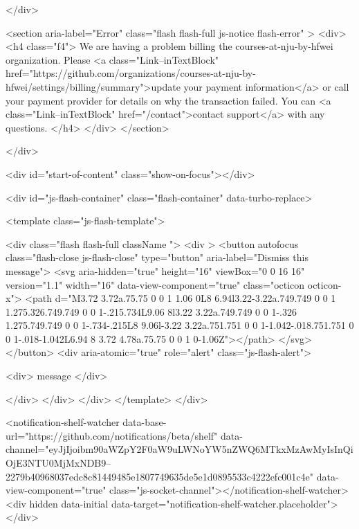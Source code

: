 {{  
</div>
        
          
                <section aria-label="Error" class="flash flash-full js-notice flash-error" >
    <div>
            <h4 class="f4">
              We are having a problem billing the courses-at-nju-by-hfwei organization.
              Please <a class="Link--inTextBlock" href="https://github.com/organizations/courses-at-nju-by-hfwei/settings/billing/summary">update your payment information</a>
              or call your payment provider for details on why the transaction failed.
              You can <a class="Link--inTextBlock" href="/contact">contact support</a> with any questions.
            </h4>
    </div>
  </section>

    </div>

  <div id="start-of-content" class="show-on-focus"></div>








    <div id="js-flash-container" class="flash-container" data-turbo-replace>




  <template class="js-flash-template">
    
<div class="flash flash-full   {{ className }}">
  <div >
    <button autofocus class="flash-close js-flash-close" type="button" aria-label="Dismiss this message">
      <svg aria-hidden="true" height="16" viewBox="0 0 16 16" version="1.1" width="16" data-view-component="true" class="octicon octicon-x">
    <path d="M3.72 3.72a.75.75 0 0 1 1.06 0L8 6.94l3.22-3.22a.749.749 0 0 1 1.275.326.749.749 0 0 1-.215.734L9.06 8l3.22 3.22a.749.749 0 0 1-.326 1.275.749.749 0 0 1-.734-.215L8 9.06l-3.22 3.22a.751.751 0 0 1-1.042-.018.751.751 0 0 1-.018-1.042L6.94 8 3.72 4.78a.75.75 0 0 1 0-1.06Z"></path>
</svg>
    </button>
    <div aria-atomic="true" role="alert" class="js-flash-alert">
      
      <div>{{ message }}</div>

    </div>
  </div>
</div>
  </template>
</div>


    
  <notification-shelf-watcher data-base-url="https://github.com/notifications/beta/shelf" data-channel="eyJjIjoibm90aWZpY2F0aW9uLWNoYW5nZWQ6MTkxMzAwMyIsInQiOjE3NTU0MjMxNDB9--2279b40968037edc8c81449485e1807749635de5e1d0895533c4222efc001c4e" data-view-component="true" class="js-socket-channel"></notification-shelf-watcher>
  <div hidden data-initial data-target="notification-shelf-watcher.placeholder"></div>






}}
